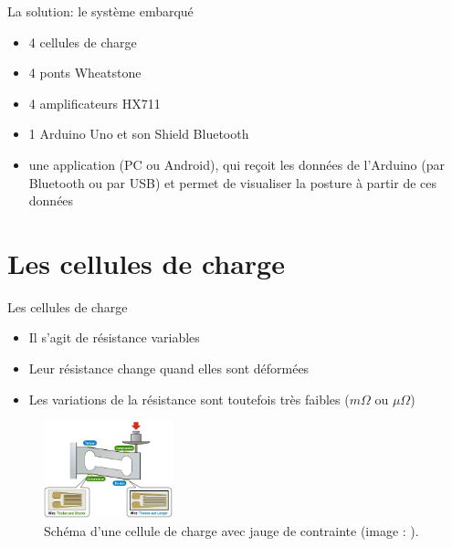 \documentclass{beamer}
\begin{document}
\begin{frame}
\begin{block}{La solution: le système embarqué}
\begin{itemize}
\item 4 cellules de charge %
\item 4 ponts Wheatstone %
\item 4 amplificateurs HX711 %
\item 1 Arduino Uno et son Shield Bluetooth%
\item une application (PC ou Android), qui reçoit les données de l'Arduino (par Bluetooth ou par USB) et permet de visualiser la posture à partir de ces données
\end{itemize}
\end{block}
\end{frame}

\section{Les cellules de charge}
\begin{frame}
\begin{block}{Les cellules de charge}
\begin{itemize}
\item Il s'agit de résistance variables
\item Leur résistance change quand elles sont déformées
\item Les variations de la résistance sont toutefois très faibles ($m\Omega$ ou $\mu\Omega$)
\end{itemize}
\begin{figure}
\begin{center}
\includegraphics[height=2.8cm]{images/load_cell.jpg}
\end{center}
\caption{Schéma d'une cellule de charge avec jauge de contrainte (image : \cite{sparkfun}).}
\label{fig:load_cell_sparkfun}
\end{figure}
\end{block}
\end{frame}
\end{document}
